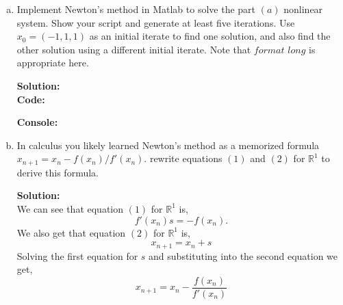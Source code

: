 \documentclass[12pt]{article}
\makeatletter
\theoremstyle{homework}
\newenvironment{exercise}[1]
{\def\@currentlabel{#1}\exercisecore}
{\endexercisecore}
\newcommand{\localhead}[1]{\par\smallskip\noindent\textbf{#1}\nobreak\\}%
\newcommand\solution{\localhead{Solution:}}
\newcommand{\Reals}{\ensuremath{\mathbb R}}
\let\RR\Reals
\makeatother
\begin{document}
\begin{exercise}{P5}
\begin{enumerate}[a.]
    \item Implement Newton's method in Matlab to solve the part $(a)$ nonlinear system. Show your script and
          generate at least five iterations. Use $x_0 = (-1,1,1)$ as an initial iterate to find one solution, and
          also find the other solution using a different initial iterate. Note that $format$ $long$ is appropriate here.\\
          \solution
          \textbf{Code:}
          \begin{center}
            
          \end{center}

          \textbf{Console:}
          \begin{center}
            
          \end{center}
          \vspace{.15in}

    \item In calculus you likely learned Newton's method as a memorized formula $x_{n+1} =x_n - f(x_n)/f'(x_n)$.
          rewrite equations $(1)$ and $(2)$ for $\RR^1$ to derive this formula.
          \solution  We can see that equation $(1)$ for $\RR^1$ is,
          \begin{equation*}
            f'(x_n)s =-f(x_n).
          \end{equation*}
          We also get that equation $(2)$ for $\RR^1$ is,
          \begin{equation*}
            x_{n+1} = x_n + s
          \end{equation*}
          Solving the first equation for $s$ and substituting into the second equation we get,
          \begin{equation*}
            x_{n+1} = x_n - \dfrac{f(x_n)}{f'(x_n)}
          \end{equation*}
  \end{enumerate}
\end{exercise}
\vspace{.25in}
\end{document}
